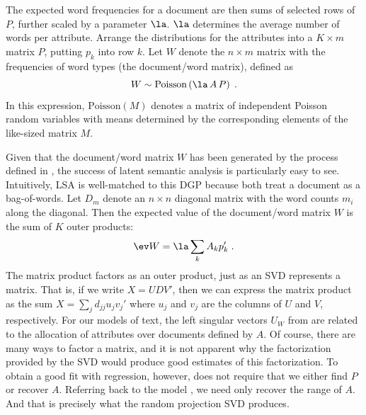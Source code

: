 \documentclass[12pt]{article}
\begin{document}
The expected word frequencies for a document are then sums of selected rows of $P$, further scaled by a parameter $\la$.   $\la$ determines the average number of words per attribute.     Arrange the distributions for the attributes into a $K \times m$ matrix $P$, putting $p_k$ into row $k$.   Let $W$ denote the $n \times m$ matrix with the frequencies of word types (the document/word matrix), defined as
\begin{equation}
	W \sim \mbox{Poisson} \left(\la \, A \, P \right) \;.
	\label{eq:simW}
\end{equation}
In this expression, $\mbox{Poisson}(M)$ denotes a matrix of independent Poisson random variables with means determined by the corresponding elements of the like-sized matrix $M$.

 
 Given that the document/word matrix $W$ has been  generated by the process defined in , the success of latent semantic analysis is particularly easy to see. Intuitively, LSA is well-matched to this DGP because both treat a document as a bag-of-words.  Let $D_m$ denote an $n \times n$ diagonal matrix with the  word counts $m_i$ along the diagonal.  Then the expected value of the document/word matrix $W$ is the sum of $K$ outer products:
\begin{equation}
    \ev W = \la \sum_k A_k p_k' \;.
  \label{eq:EW}
\end{equation}
The matrix product factors as an outer product, just as an SVD represents a matrix. That is, if we write $X = UDV'$, then we can express the matrix product as the sum $X = \sum_j d_{jj} u_j v_j'$ where $u_j$ and $v_j$ are the columns of $U$ and $V$, respectively.  For our models of text, the left singular vectors $U_W$ from  are related to the allocation of attributes over documents defined by $A$.  Of course, there are many ways to factor a matrix, and it is not apparent why the factorization provided by the SVD would produce good estimates of this factorization.  To obtain a good fit with regression, however, does not require that we either find $P$ or recover $A$.  Referring back to the model , we need only recover the range of $A$.  And that is precisely what the random projection SVD produces.
\end{document}
